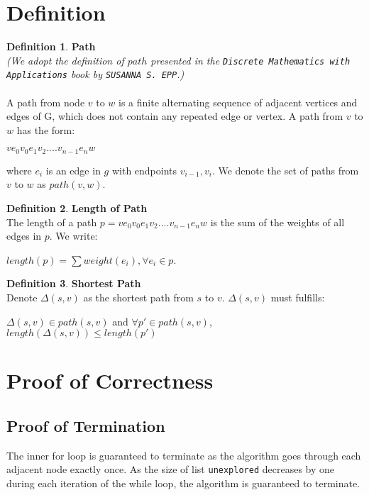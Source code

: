 \documentclass[11pt, oneside]{article}   	%
\newcommand\tab[1][1cm]{\hspace*{#1}}
\newcommand\tsp[1][0.2cm]{\hspace*{#1}}
\theoremstyle{definition}
\newtheorem{definition}{Definition}[section]
\begin{document}
\section{Definition}
\theoremstyle{definition}
\begin{definition}\textbf{Path}\\
\textit{(We adopt the definition of $path$ presented in the \texttt{Discrete Mathematics with Applications} book by \texttt{SUSANNA S. EPP}.)}
\\\\
A path from node $v$ to $w$ is a finite alternating sequence of adjacent vertices and edges of G, which does not contain any repeated edge or vertex. A path from $v$ to $w$ has the form: 
\begin{center}
 $ve_0v_0e_1v_2....v_{n-1}e_nw$ 
\end{center}
where $e_i$ is an edge in $g$ with endpoints $v_{i-1}, v_i$. We denote the set of paths from $v$ to $w$ as $path(v, w)$.
\end{definition}
\tab
\begin{definition}\textbf{Length of Path} \\
The length of a path $p = ve_0v_0e_1v_2....v_{n-1}e_nw$ is the sum of the weights of all edges in $p$. We write: 
\begin{center}
  $length(p) = \sum weight(e_i), \forall e_i \in p$. 
\end{center} 
\end{definition}
\tab
\begin{definition}\textbf{Shortest Path}\\
Denote $\Delta(s, v)$ as the shortest path from $s$ to $v$. $\Delta(s, v)$ must fulfills: 
\begin{center}
$\Delta(s, v) \in path(s, v)$ \tsp and \tsp $\forall p' \in path(s, v)$, $length(\Delta(s, v)) \leq length(p')$
\end{center}
\end{definition}

\section{Proof of Correctness}
\subsection{Proof of Termination}
The inner for loop is guaranteed to terminate as the algorithm goes through each adjacent node exactly once. As the size of list \texttt{unexplored} decreases by one during each iteration of the while loop, the algorithm is guaranteed to terminate. 
\end{document}

